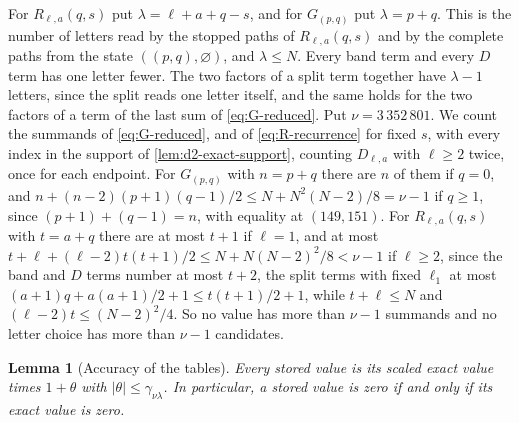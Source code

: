 \documentclass[11pt,reqno]{amsart}
\newtheorem{lemma}[lemma]{Lemma}
\theoremstyle{definition}
\theoremstyle{remark}
\begin{document}
For $R_{\ell,a}(q,s)$ put $\lambda=\ell+a+q-s$, and for $G_{(p,q)}$ put
$\lambda=p+q$.  This is the number of letters read by the stopped paths of
$R_{\ell,a}(q,s)$ and by the complete paths from the state
$((p,q),\varnothing)$, and
$\lambda\leq N$.  Every band term and every $D$ term has one letter fewer.
The two factors of a split term together have $\lambda-1$ letters, since the
split reads one letter itself, and the same holds for the two factors of a
term of the last sum of \eqref{eq:G-reduced}.  Put $\nu=3\,352\,801$.
We count the summands of \eqref{eq:G-reduced}, and of
\eqref{eq:R-recurrence} for fixed $s$, with every index in the support of
\cref{lem:d2-exact-support}, counting $D_{\ell,a}$ with $\ell\geq2$ twice,
once for each endpoint.  For $G_{(p,q)}$ with $n=p+q$ there are $n$ of them
if $q=0$, and $n+(n-2)(p+1)(q-1)/2\leq N+N^2(N-2)/8=\nu-1$ if $q\geq1$,
since $(p+1)+(q-1)=n$, with equality at $(149,151)$.  For $R_{\ell,a}(q,s)$
with $t=a+q$ there are at most $t+1$ if $\ell=1$, and at most
$t+\ell+(\ell-2)t(t+1)/2\leq N+N(N-2)^2/8<\nu-1$ if $\ell\geq2$, since
the band and $D$ terms number at most $t+2$, the split terms with fixed
$\ell_1$ at most $(a+1)q+a(a+1)/2+1\leq t(t+1)/2+1$, while $t+\ell\leq N$
and $(\ell-2)t\leq(N-2)^2/4$.  So no value has more than $\nu-1$ summands and no
letter choice has more than $\nu-1$ candidates.

\begin{lemma}[Accuracy of the tables]\label{lem:float-tables}
Every stored value is its scaled exact value times $1+\theta$ with
$|\theta|\leq\gamma_{\nu\lambda}$.  In particular, a stored value is zero
if and only if its exact value is zero.
\end{lemma}
\end{document}
